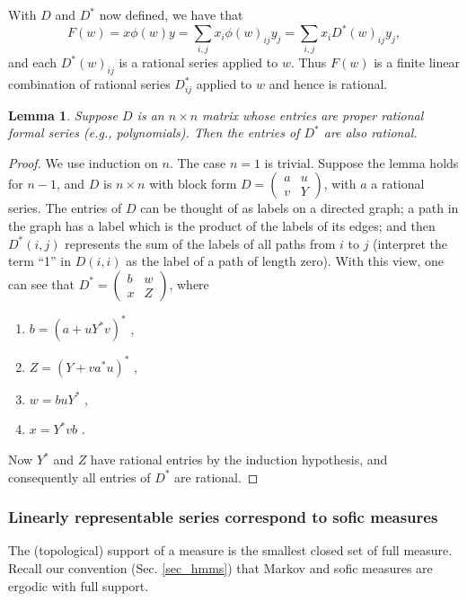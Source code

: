 \documentclass{kepart2010}
\theoremstyle{plain}
\newtheorem{lem}[thm]{Lemma}
\theoremstyle{definition}
\theoremstyle{remark}
\theoremstyle{definition}
\numberwithin{equation}{section}
\begin{document}
With $D$ and $D^*$ now defined, we have that \begin{equation} F(w) = x\phi(w) y
       =\sum_{i,j}x_{i}\phi(w)_{ij}y_{j}
       =\sum_{i,j}x_{i}D^{*}(w)_{ij}y_{j},
\end{equation} and each $D^{*}(w)_{ij}$ is a rational series applied to $w$.
Thus $F(w)$ is a finite linear combination of rational series
$D_{ij}^{*}$ applied to $w$ and hence  is rational.

\begin{lem}\label{lem_rationallemma}
Suppose $D$ is an $n\times n$ matrix whose entries are proper
rational formal series (e.g., polynomials). Then the entries of
$D^*$ are also rational.
\end{lem}
\begin{proof}
We use induction on $n$. The case $n=1$ is trivial. Suppose the
lemma holds for $n-1$, and $D$ is $n\times n$ with block form $D=
\begin{pmatrix}
a & u \\
v & Y
\end{pmatrix}$,
with $a$ a rational series. The entries of $D$ can be thought of as
labels on a directed graph; a path in the graph has a label which is
the product of the labels of its edges; and then $D^*(i,j)$
represents the sum of  the labels of all paths from $i$ to $j$
(interpret the term ``1'' in $D(i,i)$ as the label of a path of
length zero).
 With
this view, one can see that $D^*=
\begin{pmatrix}
b & w \\
x & Z
\end{pmatrix}$, where
\begin{enumerate}
\item
$b=(a+uY^*v)^*$ ,
\item
$Z= (Y+va^*u)^* $ ,
\item
$w=buY^*$ ,
\item
$x=Y^*vb$ .
\end{enumerate}
Now $Y^*$ and $Z$ have rational entries by the induction hypothesis,
and consequently all entries of $D^*$ are rational.
\end{proof}

\subsubsection{{Linearly representable series correspond to sofic
measures}}

{} {The (topological) support of a measure is the smallest closed
set of full measure. Recall our convention (Sec. \ref{sec_hmms})
that Markov and sofic measures are ergodic with full support.}
\end{document}
